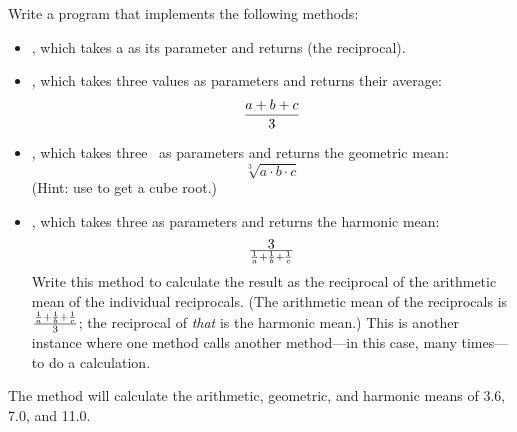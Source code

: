 \begin{exercise}
Write a program that implements the following methods:

\begin{itemize}
\item {}, which takes a  as its parameter and returns  (the reciprocal).
\item {}, which takes three  values as parameters and returns their average: 
\begin{equation*}
{{a + b + c}\over 3}
\end{equation*}
\item {}, which takes three \ as parameters and returns the geometric mean:
\begin{equation*}
\sqrt[3]{a\cdot b\cdot c}
\end{equation*}
(Hint: use  to get a cube root.)
\item {}, which takes three  as parameters and returns the harmonic mean:
\begin{equation*}
3\over {{1\over a} + {1\over b} + {1\over c}}
\end{equation*}
Write this method to calculate the result as the reciprocal of the arithmetic mean of the individual reciprocals.  (The arithmetic mean of the reciprocals is ${{1\over a} + {1\over b} + {1\over c}}\over 3$; the reciprocal of {\em that} is the harmonic mean.) This is another instance where one method calls another method---in this case, many times---to do a calculation.
\end{itemize}

The  method will calculate the arithmetic, geometric, and harmonic means of 3.6, 7.0, and 11.0.
\end{exercise}


